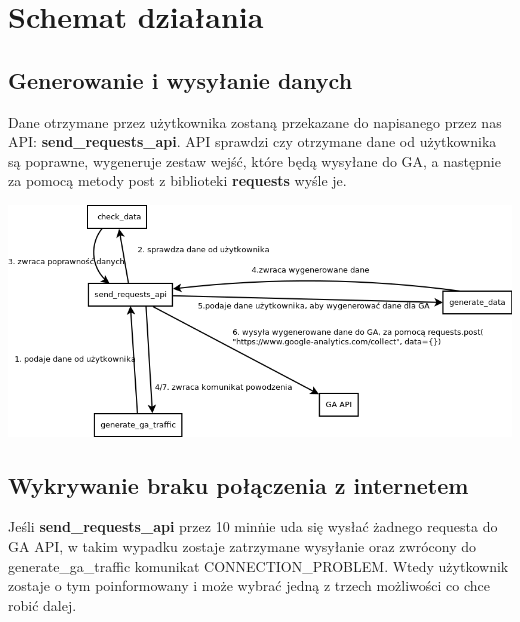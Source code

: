 \documentclass{article}
\begin{document}
\section{Schemat działania}

\subsection{Generowanie i wysyłanie danych}
Dane otrzymane przez użytkownika zostaną przekazane do napisanego przez nas API: \textbf{send\_requests\_api}. API sprawdzi czy otrzymane dane od użytkownika są poprawne, wygeneruje zestaw wejść, które będą wysyłane do GA, a następnie za pomocą metody post z biblioteki \textbf{requests} wyśle je. 

\begin{center}\includegraphics[scale=0.5]{connection_ga}\end{center}

\subsection{Wykrywanie braku połączenia z internetem}
Jeśli \textbf{send\_requests\_api} przez 10 min\. nie uda się wysłać żadnego requesta do GA API, w takim wypadku zostaje zatrzymane wysyłanie oraz zwrócony do generate\_ga\_traffic komunikat CONNECTION\_PROBLEM\@. Wtedy użytkownik zostaje o tym poinformowany i może wybrać jedną z trzech możliwości co chce robić dalej.
\end{document}
